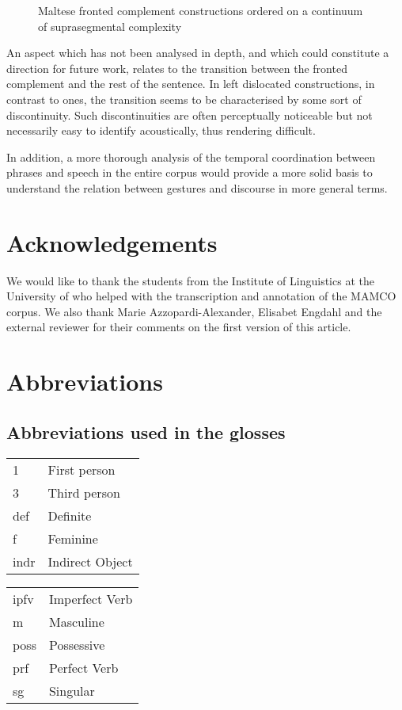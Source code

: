 \documentclass[output=paper]{LSP/langsci}
\begin{document}
\begin{figure}
   \caption{Maltese fronted complement constructions ordered on a continuum of suprasegmental complexity}
\label{fig:continuum}
\end{figure}


\newpage 
An aspect which has not been analysed in depth, and which could
constitute a direction for future work, relates to the transition
between the fronted complement and the rest of the sentence. In left
dislocated constructions, in contrast to  ones, the
transition seems to be characterised by some sort of
discontinuity. Such discontinuities are often perceptually noticeable
but not necessarily easy to identify acoustically, thus rendering
 difficult.

In addition, a more thorough analysis of the temporal coordination
between  phrases and speech in the entire corpus would provide
a more solid basis to understand the relation between gestures and
discourse in more general terms.

\section*{Acknowledgements}

We would like to thank the students from the Institute of Linguistics
at the University of  who helped with the transcription and
annotation of the MAMCO corpus. We also thank Marie
Azzopardi-Alexander, Elisabet Engdahl and the external reviewer for
their comments on the first version of this article.




\section*{Abbreviations}
\subsection*{Abbreviations used in the glosses}
\begin{tabularx}{.45\textwidth}{lQ}
1 & First person \\
3 & Third person \\
{\sc def} & Definite \\ 
{\sc f}  & Feminine \\
{\sc indr}  & Indirect Object \\
\end{tabularx}
\begin{tabularx}{.45\textwidth}{lQ}
{\sc ipfv}  & Imperfect Verb \\
{\sc m}  & Masculine \\
{\sc poss}  & Possessive \\ 
{\sc prf}  & Perfect Verb \\
{\sc sg}  & Singular \\
\end{tabularx}
  
\end{document}
